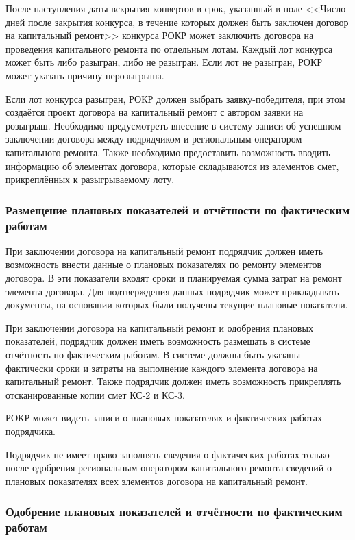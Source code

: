 После наступления даты вскрытия конвертов в срок, указанный в поле <<Число дней после закрытия конкурса, в течение которых должен быть заключен договор на капитальный ремонт>> конкурса РОКР может заключить договора на проведения капитального ремонта по отдельным лотам.
Каждый лот конкурса может быть либо разыгран, либо не разыгран.
Если лот не разыгран, РОКР может указать причину нерозыгрыша.

Если лот конкурса разыгран, РОКР должен выбрать заявку-победителя, при этом создаётся проект договора на капитальный ремонт с автором заявки на розыгрыш.
Необходимо предусмотреть внесение в систему записи об успешном заключении договора между подрядчиком и региональным оператором капитального ремонта.
Также необходимо предоставить возможность вводить информацию об элементах договора, которые складываются из элементов смет, прикреплённых к разыгрываемому лоту.

\subsubsection{Размещение плановых показателей и отчётности по фактическим работам}

При заключении договора на капитальный ремонт подрядчик должен иметь возможность внести данные о плановых показателях по ремонту элементов договора.
В эти показатели входят сроки и планируемая сумма затрат на ремонт элемента договора.
Для подтверждения данных подрядчик может прикладывать документы, на основании которых были получены текущие плановые показатели.

При заключении договора на капитальный ремонт и одобрения плановых показателей, подрядчик должен иметь возможность размещать в системе отчётность по фактическим работам.
В системе должны быть указаны фактически сроки и затраты на выполнение каждого элемента договора на капитальный ремонт.
Также подрядчик должен иметь возможность прикреплять отсканированные копии смет КС-2 и КС-3.

РОКР может видеть записи о плановых показателях и фактических работах подрядчика.

Подрядчик не имеет право заполнять сведения о фактических работах только после одобрения региональным оператором капитального ремонта сведений о плановых показателях всех элементов договора на капитальный ремонт.

\subsubsection{Одобрение плановых показателей и отчётности по фактическим работам}

